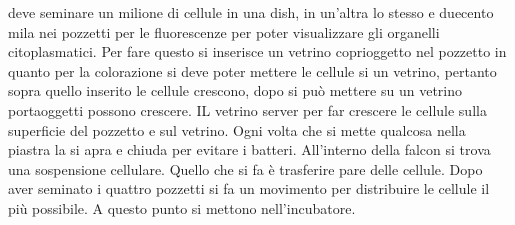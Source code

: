 deve seminare un milione di cellule in una dish, in un'altra lo stesso e duecento mila nei pozzetti per le fluorescenze per poter visualizzare gli organelli citoplasmatici. Per fare
questo si inserisce un vetrino coprioggetto nel pozzetto in quanto per la colorazione si deve poter mettere le cellule si un vetrino, pertanto sopra quello inserito le cellule crescono,
dopo si pu\`o mettere su un vetrino portaoggetti possono crescere. IL vetrino server per far crescere le cellule sulla superficie del pozzetto e sul vetrino. Ogni volta che si mette 
qualcosa nella piastra la si apra e chiuda per evitare i batteri. All'interno della falcon si trova una sospensione cellulare. Quello che si fa \`e trasferire pare delle cellule. Dopo 
aver seminato i quattro pozzetti si fa un movimento per distribuire le cellule il pi\`u possibile. A questo punto si mettono nell'incubatore. 
